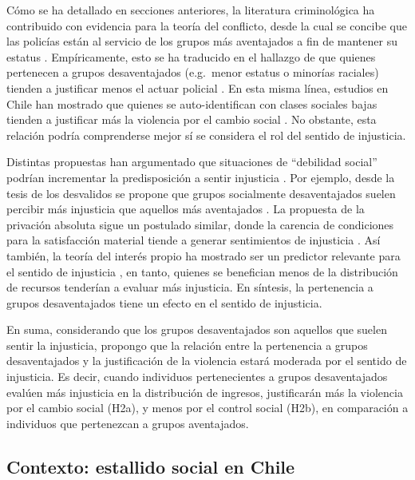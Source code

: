 \documentclass[12pt,twoside]{templates/facsothesis}
\begin{document}
Cómo se ha detallado en secciones anteriores, la literatura criminológica ha contribuido con evidencia para la teoría del conflicto, desde la cual se concibe que las policías están al servicio de los grupos más aventajados a fin de mantener su estatus \citep[@][]{Thompson2004}. Empíricamente, esto se ha traducido en el hallazgo de que quienes pertenecen a grupos desaventajados (e.g.~menor estatus o minorías raciales) tienden a justificar menos el actuar policial \citep[e.g.][]{Arthur1994}. En esta misma línea, estudios en Chile han mostrado que quienes se auto-identifican con clases sociales bajas tienden a justificar más la violencia por el cambio social \citep{Gerber2017}. No obstante, esta relación podría comprenderse mejor sí se considera el rol del sentido de injusticia.

Distintas propuestas han argumentado que situaciones de ``debilidad social'' podrían incrementar la predisposición a sentir injusticia \citep{Resh2010}. Por ejemplo, desde la tesis de los desvalidos se propone que grupos socialmente desaventajados suelen percibir más injusticia que aquellos más aventajados \citep{Robinson1983}. La propuesta de la privación absoluta sigue un postulado similar, donde la carencia de condiciones para la satisfacción material tiende a generar sentimientos de injusticia \citep{Ladin2014}. Así también, la teoría del interés propio ha mostrado ser un predictor relevante para el sentido de injusticia \citep{Ng2005}, en tanto, quienes se benefician menos de la distribución de recursos tenderían a evaluar más injusticia. En síntesis, la pertenencia a grupos desaventajados tiene un efecto en el sentido de injusticia.

En suma, considerando que los grupos desaventajados son aquellos que suelen sentir la injusticia, propongo que la relación entre la pertenencia a grupos desaventajados y la justificación de la violencia estará moderada por el sentido de injusticia. Es decir, cuando individuos pertenecientes a grupos desaventajados evalúen más injusticia en la distribución de ingresos, justificarán más la violencia por el cambio social (H2a), y menos por el control social (H2b), en comparación a individuos que pertenezcan a grupos aventajados.

\hypertarget{contexto-estallido-social-en-chile}{%
\subsection{Contexto: estallido social en Chile}\label{contexto-estallido-social-en-chile}}
\end{document}
